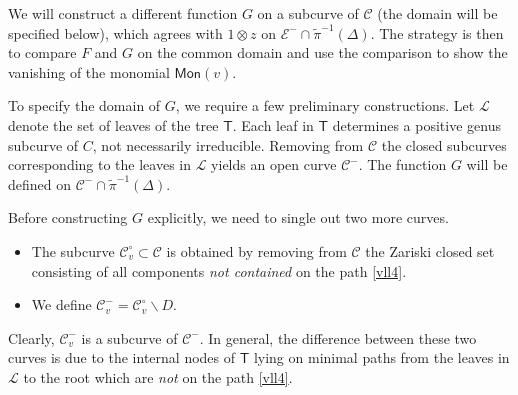\documentclass[11pt]{amsart}
\theoremstyle{definition}
\renewcommand{\tilde}{\widetilde}
\begin{document}
{We will construct a different function $G$ on a subcurve of $\mathcal C$ (the domain will be specified below), which agrees with $1\otimes z$ on $\mathcal E^-\cap \tilde \pi^{-1}(\Delta)$. The strategy is then to compare $F$ and $G$ on the common domain and use the comparison to show the vanishing of the monomial $\mathsf{Mon} (v)$. 

To specify the domain of $G$, we require a few preliminary constructions.  
Let $\mathcal L$ denote the set of leaves
of the tree $\mathsf{T}$.
Each leaf in $\mathsf{T}$ determines a positive genus subcurve of $C$, not necessarily irreducible. Removing from $\mathcal C$ the closed subcurves corresponding to the leaves in $\mathcal{L}$ yields an open curve $\mathcal C^{-}$. %
The function $G$ will be defined on ${\mathcal C}^{-}\cap \widetilde \pi^{-1}(\Delta)$. 


Before constructing $G$ explicitly, we need to single out two more curves. 
\begin{itemize} 
\item The subcurve
$\mathcal {C}_v^{\circ}\subset \mathcal {C}$ is obtained
by removing from $\mathcal {C}$ the Zariski closed set
consisting of
all components {\em not contained} on the path \eqref{vll4}. %



\item We define $\mathcal C_v^-=\mathcal C_v^{\circ}\smallsetminus D$. %
\end{itemize} 
Clearly, $\mathcal C_v^-$ is a subcurve of $\mathcal C^{-}$. In general, the difference between these two curves is due to the internal nodes of $\mathsf T$ lying on minimal paths from the leaves in $\mathcal L$ to the root which are {\em not} on the path \eqref{vll4}. 

}
\end{document}
